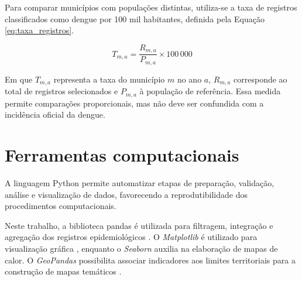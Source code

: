 Para comparar municípios com populações distintas, utiliza-se a taxa de registros classificados como dengue por 100 mil habitantes, definida pela Equação \ref{eq:taxa_registros}.

\begin{equation}
    \label{eq:taxa_registros}
    T_{m,a} = \frac{R_{m,a}}{P_{m,a}} \times 100\,000
\end{equation}

Em que $T_{m,a}$ representa a taxa do município $m$ no ano $a$, $R_{m,a}$ corresponde ao total de registros selecionados e $P_{m,a}$ à população de referência. Essa medida permite comparações proporcionais, mas não deve ser confundida com a incidência oficial da dengue.

\section{Ferramentas computacionais}

A linguagem Python permite automatizar etapas de preparação, validação, análise e visualização de dados, favorecendo a reprodutibilidade dos procedimentos computacionais.

Neste trabalho, a biblioteca pandas é utilizada para filtragem, integração e agregação dos registros epidemiológicos \cite{McKinney2010}. O \textit{Matplotlib} é utilizado para visualização gráfica \cite{Hunter2007}, enquanto o \textit{Seaborn} auxilia na elaboração de mapas de calor. O \textit{GeoPandas} possibilita associar indicadores aos limites territoriais para a construção de mapas temáticos \cite{Jordahl2020}.


